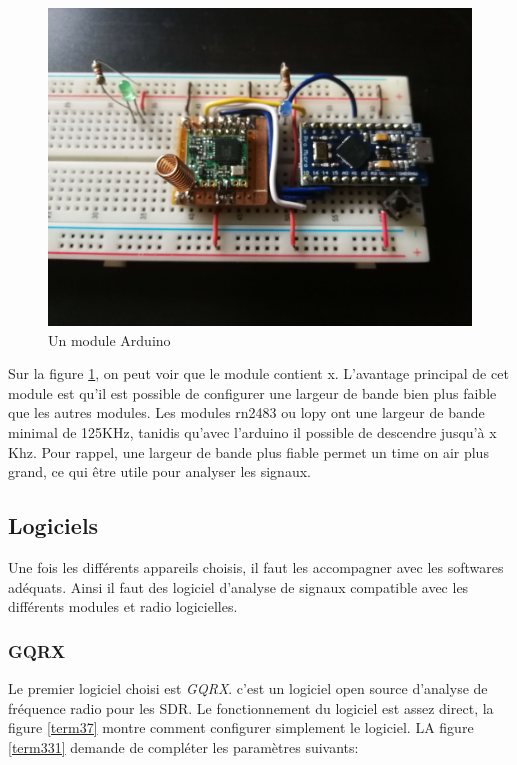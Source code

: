\begin{figure}[h]
\centering

\includegraphics[scale=0.08]{images/arduino.png}
\caption{Un module Arduino}\label{term36}
\end{figure}

Sur la figure \ref{term36}, on peut voir que le module contient x. L'avantage principal de cet module est qu'il est possible de configurer une largeur de bande bien plus faible que les autres modules. Les modules rn2483 ou lopy ont une largeur de bande minimal de 125KHz, tanidis qu'avec l'arduino il possible de descendre jusqu'à x Khz. Pour rappel, une largeur de bande plus fiable permet un time on air plus grand, ce qui être utile pour analyser les signaux. 

\subsection{Logiciels}

Une fois les différents appareils choisis, il faut les accompagner avec les softwares adéquats. Ainsi il faut des logiciel d'analyse de signaux compatible avec les différents modules et radio logicielles.

\subsubsection{GQRX}

Le premier logiciel choisi est \textit{GQRX}. c'est un logiciel open source d'analyse de fréquence radio pour les SDR. Le fonctionnement du logiciel est assez direct, la figure \ref{term37} montre comment configurer simplement le logiciel. LA figure \ref{term331} demande de compléter les paramètres suivants:

